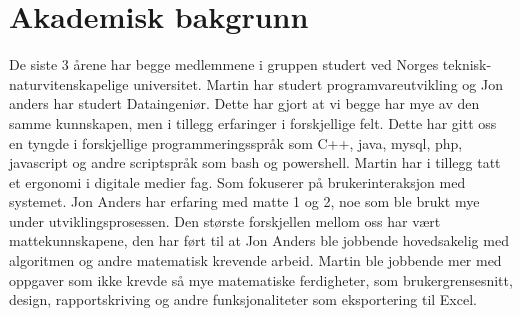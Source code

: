 \section{Akademisk bakgrunn}
De siste 3 årene har begge medlemmene i gruppen studert ved Norges teknisk-naturvitenskapelige universitet. Martin har studert programvareutvikling og Jon anders har studert Dataingeniør. Dette har gjort at vi begge har mye av den samme kunnskapen, men i tillegg erfaringer i forskjellige felt. Dette har gitt oss en tyngde i forskjellige programmeringsspråk som C++, java, mysql, php, javascript og andre scriptspråk som bash og powershell. Martin har i tillegg tatt et ergonomi i digitale medier fag. Som fokuserer på brukerinteraksjon med systemet. Jon Anders har erfaring med matte 1 og 2, noe som ble brukt mye under utviklingsprosessen. Den største forskjellen mellom oss har vært mattekunnskapene, den har ført til at Jon Anders ble jobbende hovedsakelig med algoritmen og andre matematisk krevende arbeid. Martin ble jobbende mer med oppgaver som ikke krevde så mye matematiske ferdigheter, som brukergrensesnitt, design, rapportskriving og andre funksjonaliteter som eksportering til Excel.


\clearpage
